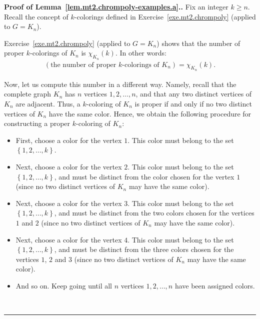\documentclass[numbers=enddot,12pt,final,onecolumn,notitlepage]{scrartcl}%
\theoremstyle{definition}
\newenvironment{proof}[1][Proof]{\noindent\textbf{#1.} }{\ \rule{0.5em}{0.5em}}
\newcommand{\set}[1]{\left\{ #1 \right\}}
\newcommand{\tup}[1]{\left( #1 \right)}
\begin{document}
\begin{proof}[Proof of Lemma~\ref{lem.mt2.chrompoly-examples.a}.]
Fix an integer $k \geq n$.
Recall the concept of $k$-colorings defined in
Exercise~\ref{exe.mt2.chrompoly} (applied to $G = K_n$).

Exercise~\ref{exe.mt2.chrompoly} (applied to $G = K_n$)
shows that the number of proper $k$-colorings of $K_n$ is
$\chi_{K_n} \tup{k}$.
In other words:
\begin{align}
\tup{\text{the number of proper } k \text{-colorings of }
     K_n}
= \chi_{K_n} \tup{k} .
\label{pf.lem.mt2.chrompoly-examples.a.1}
\end{align}

Now, let us compute this number in a different way.
Namely, recall that the complete graph $K_n$ has $n$
vertices $1, 2, \ldots, n$, and that any two distinct
vertices of $K_n$ are adjacent.
Thus, a $k$-coloring of $K_n$ is proper if and only if
no two distinct vertices of $K_n$ have the same color.
Hence, we obtain the following procedure for constructing
a proper $k$-coloring of $K_n$:

\begin{itemize}
\item First, choose a color for the vertex $1$.
      This color must belong to the set
      $\set{1, 2, \ldots, k}$.
\item Next, choose a color for the vertex $2$.
      This color must belong to the set
      $\set{1, 2, \ldots, k}$, and must be distinct
      from the color chosen for the vertex $1$ (since
      no two distinct vertices of $K_n$ may have the
      same color).
\item Next, choose a color for the vertex $3$.
      This color must belong to the set
      $\set{1, 2, \ldots, k}$, and must be distinct
      from the two colors chosen for the vertices $1$
      and $2$ (since no two distinct vertices of
      $K_n$ may have the same color).
\item Next, choose a color for the vertex $4$.
      This color must belong to the set
      $\set{1, 2, \ldots, k}$, and must be distinct
      from the three colors chosen for the vertices $1$,
      $2$ and $3$ (since no two distinct vertices of
      $K_n$ may have the same color).
\item And so on. Keep going until all $n$ vertices
      $1, 2, \ldots, n$ have been assigned colors.
\end{itemize}


\end{proof}
\end{document}
